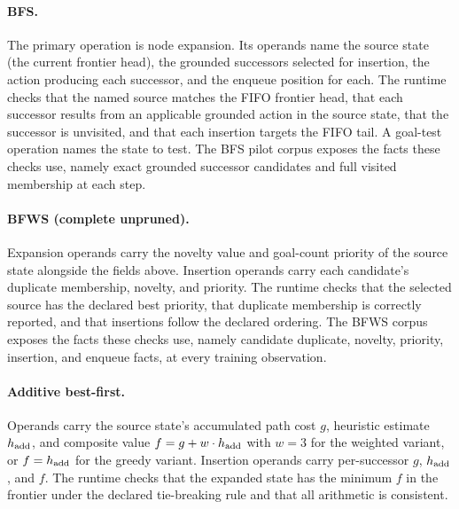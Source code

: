 \paragraph{BFS.}
The primary operation is node expansion. Its operands name the source state (the current frontier head), the grounded successors selected for insertion, the action producing each successor, and the enqueue position for each. The runtime checks that the named source matches the FIFO frontier head, that each successor results from an applicable grounded action in the source state, that the successor is unvisited, and that each insertion targets the FIFO tail. A goal-test operation names the state to test. The BFS pilot corpus exposes the facts these checks use, namely exact grounded successor candidates and full visited membership at each step.

\paragraph{BFWS (complete unpruned).}
Expansion operands carry the novelty value and goal-count priority of the source state alongside the fields above. Insertion operands carry each candidate's duplicate membership, novelty, and priority. The runtime checks that the selected source has the declared best priority, that duplicate membership is correctly reported, and that insertions follow the declared ordering. The BFWS corpus exposes the facts these checks use, namely candidate duplicate, novelty, priority, insertion, and enqueue facts, at every training observation.

\paragraph{Additive best-first.}
Operands carry the source state's accumulated path cost $g$, heuristic estimate $h_{\rm add}$, and composite value $f = g + w \cdot h_{\rm add}$ with $w = 3$ for the weighted variant, or $f = h_{\rm add}$ for the greedy variant. Insertion operands carry per-successor $g$, $h_{\rm add}$, and $f$. The runtime checks that the expanded state has the minimum $f$ in the frontier under the declared tie-breaking rule and that all arithmetic is consistent.

